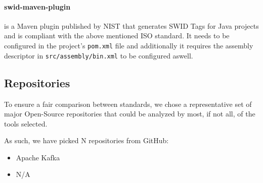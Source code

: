 \paragraph{swid-maven-plugin} is a Maven plugin published by NIST \cite{repository:swid-maven-plugin} that generates SWID Tags for Java projects and is compliant with the above mentioned ISO standard. It needs to be configured in the project's \verb|pom.xml| file and additionally it requires the assembly descriptor in \verb|src/assembly/bin.xml| to be configured aswell.



\subsection{Repositories} \label{methodology:repositories}

To ensure a fair comparison between standards, we chose a representative set of major Open-Source repositories that could be analyzed by most, if not all, of the tools selected.

As such, we have picked N repositories from GitHub:

\begin{itemize}
    \item Apache Kafka \cite{repository:dataset:kafka}
    \item N/A
\end{itemize}